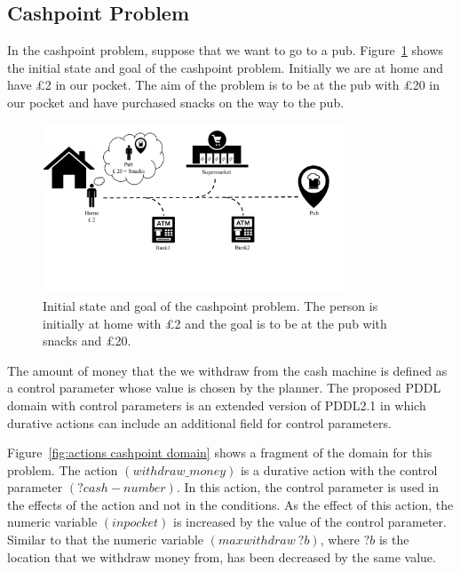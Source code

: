 \subsection{Cashpoint Problem}

In the cashpoint problem, suppose that we want to go to a pub. Figure~\ref{fig:cashpoint} shows the initial state and goal of the cashpoint problem. Initially we are at home and have \pounds2 in our pocket. The aim of the problem is to be at the pub with \pounds20 in our pocket and have purchased snacks on the way to the pub.

\begin{figure}[!ht]
\centering
\includegraphics[width=0.80\textwidth]{diagrams/cashpoint.pdf}
\caption{Initial state and goal of the cashpoint problem. The person is initially at home with \pounds2 and the goal is to be at the pub with snacks and \pounds20.}
\label{fig:cashpoint}
\end{figure}

The amount of money that the we withdraw from the cash machine is defined as a control parameter whose value is chosen by the planner. The proposed PDDL domain with control parameters is an extended version of PDDL2.1 in which durative actions can include an additional field for control parameters.

Figure~\ref{fig:actions cashpoint domain} shows a fragment of the domain for this problem. The action $(withdraw\_money)$ is a durative action with the control parameter $(?cash - number)$. In this action, the control parameter is used in the effects of the action and not in the conditions. As the effect of this action, the numeric variable $(inpocket)$ is increased by the value of the control parameter. Similar to that the numeric variable $(maxwithdraw \ ?b)$, where $?b$ is the location that we withdraw money from, has been decreased by the same value.

